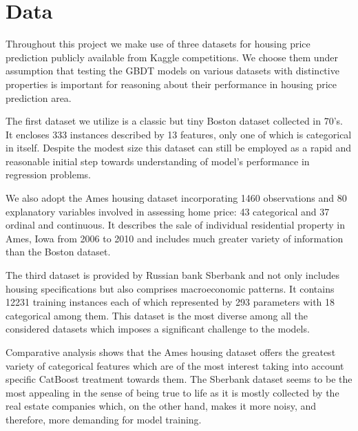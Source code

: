 \section{Data}
\label{sec:data}
Throughout this project we make use of three datasets for housing price prediction publicly available from Kaggle competitions. We choose them under assumption that testing the GBDT models on various datasets with distinctive properties is important for reasoning about their performance in housing price prediction area. 

The first dataset we utilize is a classic but tiny Boston dataset \cite{boston1978housing} collected in 70's. It encloses 333 instances described by 13 features, only one of which is categorical in itself. Despite the modest size this dataset can still be employed as a rapid and reasonable initial step towards understanding of model's performance in regression problems.

We also adopt the Ames housing dataset \cite{de2011ames} incorporating 1460 observations and 80 explanatory variables involved in assessing home price: 43 categorical and 37 ordinal and continuous. It describes the sale of individual residential property in Ames, Iowa from 2006 to 2010 and includes much greater variety of information than the Boston dataset.

The third dataset is provided by Russian bank Sberbank \cite{sberbank2017housing} and not only includes housing specifications but also comprises macroeconomic patterns. It contains 12231 training instances each of which represented by 293 parameters with 18 categorical among them. This dataset is the most diverse among all the considered datasets which imposes a significant challenge to the models.

Comparative analysis shows that the Ames housing dataset offers the greatest variety of categorical features which are of the most interest taking into account specific CatBoost treatment towards them. The Sberbank dataset seems to be the most appealing in the sense of being true to life as it is mostly collected by the real estate companies which, on the other hand, makes it more noisy, and therefore, more demanding for model training.